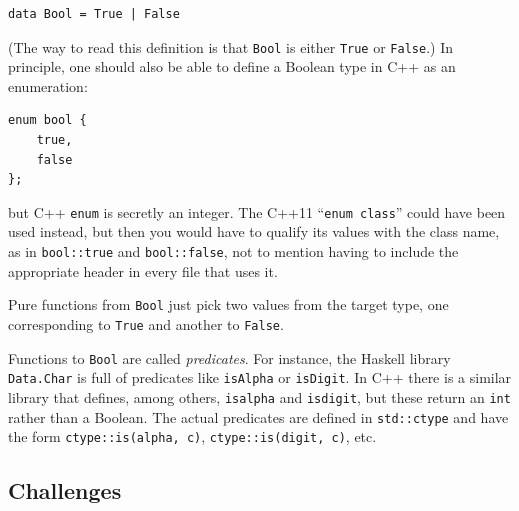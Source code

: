 \begin{verbatim}
data Bool = True | False
\end{verbatim}

(The way to read this definition is that \texttt{Bool} is either
\texttt{True} or \texttt{False}.) In principle, one should also be able
to define a Boolean type in C++ as an enumeration:

\begin{verbatim}
enum bool { 
    true,
    false
};
\end{verbatim}

but C++ \texttt{enum} is secretly an integer. The C++11
``\texttt{enum class}'' could have been used instead, but then you
would have to qualify its values with the class name, as in
\texttt{bool::true} and \texttt{bool::false}, not to mention having to
include the appropriate header in every file that uses it.

Pure functions from \texttt{Bool} just pick two values from the target
type, one corresponding to \texttt{True} and another to \texttt{False}.

Functions to \texttt{Bool} are called \emph{predicates}. For instance,
the Haskell library \texttt{Data.Char} is full of predicates like
\texttt{isAlpha} or \texttt{isDigit}. In C++ there is a similar library
\texttt{} that defines, among others, \texttt{isalpha} and
\texttt{isdigit}, but these return an \texttt{int} rather than a
Boolean. The actual predicates are defined in \texttt{std::ctype} and
have the form \texttt{ctype::is(alpha,\ c)},
\texttt{ctype::is(digit,\ c)}, etc.

\subsection{Challenges}\label{challenges}

